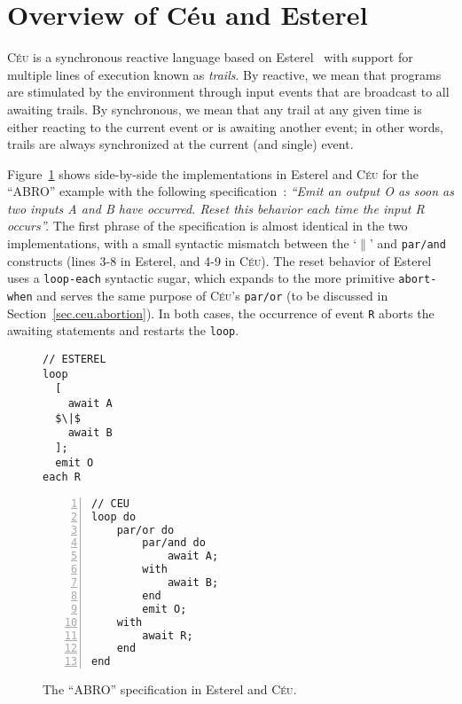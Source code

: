 \documentclass{acm_proc_article-sp}
\newcommand{\CEU}{\textsc{C\'{e}u}\xspace}
\newcommand{\code}[1] {{\small{\texttt{#1}}}}
\newcommand{\1}{\;}
\newcommand{\2}{\;\;}
\newcommand{\3}{\;\;\;}
\newcommand{\5}{\;\;\;\;\;}
\begin{document}
\section{Overview of C\'eu and Esterel}
\label{sec.ceu}

\CEU is a synchronous reactive language based on Esterel~\cite{esterel.ieee91} 
with support for multiple lines of execution known as \emph{trails}.
By reactive, we mean that programs are stimulated by the environment through 
input events that are broadcast to all awaiting trails.
By synchronous, we mean that any trail at any given time is either reacting to 
the current event or is awaiting another event;
in other words, trails are always synchronized at the current (and single) 
event.

Figure~\ref{lst.abro} shows side-by-side the implementations in Esterel and 
\CEU for the ``ABRO'' example with the following 
specification~\cite{esterel.primer}:
%
\emph{``Emit an output O as soon as two inputs A and B have occurred.
Reset this behavior each time the input R occurs''.}
%
The first phrase of the specification is almost identical in the two 
implementations, with a small syntactic mismatch between the `$\|$' and 
\code{par/and} constructs (lines 3-8 in Esterel, and 4-9 in \CEU).
%
The reset behavior of Esterel uses a \code{loop-each} syntactic sugar, which 
expands to the more primitive \code{abort-when} and serves the same purpose of 
\CEU's \code{par/or} (to be discussed in Section~\ref{sec.ceu.abortion}).
In both cases, the occurrence of event \code{R} aborts the awaiting statements 
and restarts the \code{loop}.

\begin{figure}[t]
\begin{minipage}[t]{0.40\linewidth}
\begin{lstlisting}[mathescape=true]
// ESTEREL
loop
  [
    await A
  $\|$
    await B
  ];
  emit O
each R
\end{lstlisting}
\end{minipage}
%
\begin{minipage}[t]{0.55\linewidth}
\begin{lstlisting}[numbers=left,xleftmargin=2.5em]
// CEU
loop do
    par/or do
        par/and do
            await A;
        with
            await B;
        end
        emit O;
    with
        await R;
    end
end
\end{lstlisting}
\end{minipage}
\caption{ The ``ABRO'' specification in Esterel and \CEU. %
{\small
}
\label{lst.abro}
}
\end{figure}
\end{document}
